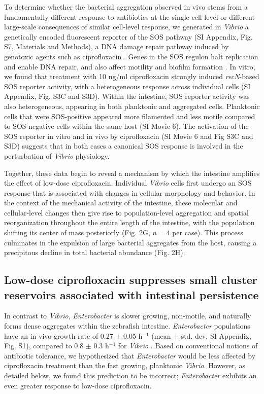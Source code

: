 To determine whether the bacterial aggregation observed in vivo stems from a fundamentally different response to antibiotics at the single-cell level or different large-scale consequences of similar cell-level response, we generated in \textit{Vibrio} a genetically encoded fluorescent reporter of the SOS pathway (SI Appendix, Fig. S7, Materials and Methods), a DNA damage repair pathway induced by genotoxic agents such as ciprofloxacin \cite{erill2007aeons,kreuzer2013dna}. Genes in the SOS regulon halt replication and enable DNA repair, and also affect motility and biofilm formation \cite{irazoki2016sos,goneau2015subinhibitory}. In vitro, we found that treatment with 10 ng/ml ciprofloxacin strongly induced \textit{recN}-based SOS reporter activity, with a heterogeneous response across individual cells (SI Appendix, Fig. S3C and S3D). Within the intestine, SOS reporter activity was also heterogeneous, appearing in both planktonic and aggregated cells. Planktonic cells that were SOS-positive appeared more filamented and less motile compared to SOS-negative cells within the same host (SI Movie 6). The activation of the SOS reporter in vitro and in vivo by ciprofloxacin (SI Movie 6 and Fig S3C and S3D) suggests that in both cases a canonical SOS response is involved in the perturbation of \textit{Vibrio} physiology. 

Together, these data begin to reveal a mechanism by which the intestine amplifies the effect of low-dose ciprofloxacin. Individual \textit{Vibrio} cells first undergo an SOS response that is associated with changes in cellular morphology and behavior. In the context of the mechanical activity of the intestine, these molecular and cellular-level changes then give rise to population-level aggregation and spatial reorganization throughout the entire length of the intestine, with the population shifting its center of mass posteriorly (Fig. 2G, $n=4$ per case). This process culminates in the expulsion of large bacterial aggregates from the host, causing a precipitous decline in total bacterial abundance (Fig. 2H).



\subsection{Low-dose ciprofloxacin suppresses small cluster reservoirs associated with intestinal persistence}

In contrast to \textit{Vibrio}, \textit{Enterobacter} is slower growing, non-motile, and naturally forms dense aggregates within the zebrafish intestine. \textit{Enterobacter} populations have an in vivo growth rate of 0.27 $\pm$ 0.05 h$^{-1}$ (mean $\pm$ std. dev, SI Appendix, Fig. S1), compared to 0.8 $\pm$ 0.3 h$^{-1}$ for \textit{Vibrio} \cite{wiles_host_2016}. Based on conventional notions of antibiotic tolerance, we hypothesized that \textit{Enterobacter} would be less affected by ciprofloxacin treatment than the fast growing, planktonic \textit{Vibrio}. However, as detailed below, we found this prediction to be incorrect; \textit{Enterobacter} exhibits an even greater response  to low-dose ciprofloxacin.

